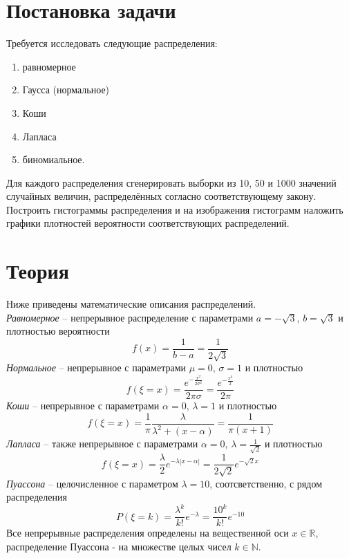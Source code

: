 \documentclass[report1.tex]{subfiles}
\begin{document}
\section{Постановка задачи}
Требуется исследовать следующие распределения:
\begin{enumerate}
	\item равномерное
	\item Гаусса (нормальное)
	\item Коши
	\item Лапласа
	\item биномиальное.
\end{enumerate}
Для каждого распределения сгенерировать выборки из 10, 50 и 1000 значений случайных величин, распределённых согласно соответствующему закону. Построить гистограммы распределения и на изображения гистограмм наложить графики плотностей вероятности соответствующих распределений.
\newpage
\section{Теория}
Ниже приведены математические описания распределений.\\
\emph{Равномерное} -- непрерывное распределение с параметрами $a=-\sqrt{3}$, $b=\sqrt{3}$ и плотностью вероятности
\begin{equation}\label{eq:uniform}
f(x)=\frac{1}{b-a} = \frac{1}{2\sqrt{3}}
\end{equation}
\emph{Нормальное} -- непрерывное с параметрами $\mu=0$, $\sigma=1$ и плотностью
\begin{equation}\label{eq:norm}
f(\xi=x)=\frac{e^{-\frac{x^2}{2\sigma^2}}}{2\pi\sigma} = \frac{e^{-\frac{x^2}{2}}}{2\pi}
\end{equation}
\emph{Коши} -- непрерывное с параметрами $\alpha=0$, $\lambda=1$ и плотностью
\begin{equation}\label{eq:cauchy}
f(\xi=x)=\frac{1}{\pi} \frac{\lambda}{\lambda^2+(x-\alpha)}=\frac{1}{\pi(x+1)}
\end{equation}
\emph{Лапласа} -- также непрерывное с параметрами $\alpha=0$, $\lambda=\frac{1}{\sqrt{2}}$ и плотностью
\begin{equation}\label{eq:laplace}
f(\xi=x)=\frac{\lambda}{2} e^{-\lambda |x-\alpha|}=\frac{1}{2\sqrt{2}} e^{-\sqrt{2}x}
\end{equation}
\emph{Пуассона} -- целочисленное с параметром $\lambda=10$, соотсветственно, с рядом распределения
\begin{equation}\label{eq:poisson}
P(\xi=k)=\frac{\lambda^k}{k!} e^{-\lambda}=\frac{10^k}{k!} e^{-10}
\end{equation}
Все непрерывные распределения определены на вещественной оси $x\in \mathds{R}$, распределение Пуассона - на множестве целых чисел $k\in\mathds{N}$.\\
\end{document}
